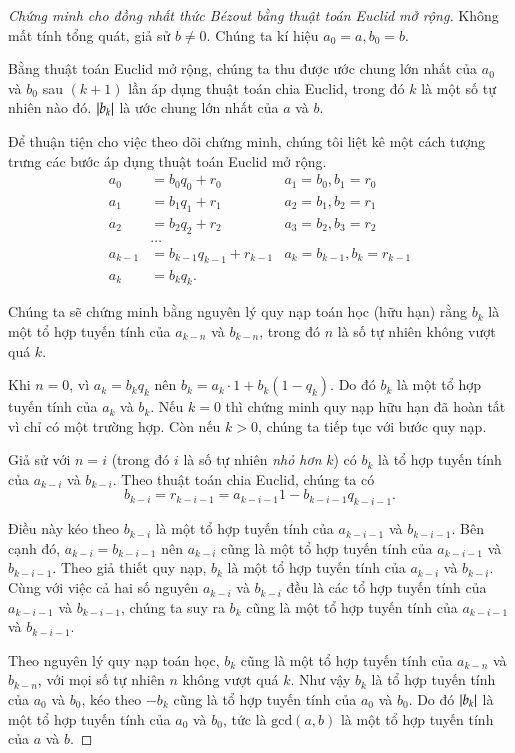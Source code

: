 \begin{proof}[Chứng minh cho đồng nhất thức B\'{e}zout bằng thuật toán Euclid mở rộng]
	Không mất tính tổng quát, giả sử $b\ne 0$. Chúng ta kí hiệu $a_{0} = a, b_{0} = b$.

	Bằng thuật toán Euclid mở rộng, chúng ta thu được ước chung lớn nhất của $a_{0}$ và $b_{0}$ sau $(k+1)$ lần áp dụng thuật toán chia Euclid, trong đó $k$ là một số tự nhiên nào đó. $\left\vert{b_{k}}\right\vert$ là ước chung lớn nhất của $a$ và $b$.

	Để thuận tiện cho việc theo dõi chứng minh, chúng tôi liệt kê một cách tượng trưng các bước áp dụng thuật toán Euclid mở rộng.
	\begin{align*}
		a_{0}   & = b_{0} q_{0} + r_{0}       & a_{1} = b_{0}, b_{1} = r_{0}     \\
		a_{1}   & = b_{1} q_{1} + r_{1}       & a_{2} = b_{1}, b_{2} = r_{1}     \\
		a_{2}   & = b_{2} q_{2} + r_{2}       & a_{3} = b_{2}, b_{3} = r_{2}     \\
		        & \ldots                                                         \\
		a_{k-1} & = b_{k-1} q_{k-1} + r_{k-1} & a_{k} = b_{k-1}, b_{k} = r_{k-1} \\
		a_{k}   & = b_{k} q_{k}.
	\end{align*}

	Chúng ta sẽ chứng minh bằng nguyên lý quy nạp toán học (hữu hạn) rằng $b_{k}$ là một tổ hợp tuyến tính của $a_{k-n}$ và $b_{k-n}$, trong đó $n$ là số tự nhiên không vượt quá $k$.

	Khi $n = 0$, vì $a_{k} = b_{k} q_{k}$ nên $b_{k} = a_{k}\cdot 1 + b_{k} (1 - q_{k})$.  Do đó $b_{k}$ là một tổ hợp tuyến tính của $a_{k}$ và $b_{k}$. Nếu $k = 0$ thì chứng minh quy nạp hữu hạn đã hoàn tất vì chỉ có một trường hợp. Còn nếu $k > 0$, chúng ta tiếp tục với bước quy nạp.

	Giả sử với $n = i$ (trong đó $i$ là số tự nhiên \textit{nhỏ hơn} $k$) có $b_{k}$ là tổ hợp tuyến tính của $a_{k-i}$ và $b_{k-i}$. Theo thuật toán chia Euclid, chúng ta có
	\[
		b_{k-i} = r_{k-i-1} = a_{k-i-1} 1 - b_{k-i-1} q_{k-i-1}.
	\]

	Điều này kéo theo $b_{k-i}$ là một tổ hợp tuyến tính của $a_{k-i-1}$ và $b_{k-i-1}$. Bên cạnh đó, $a_{k-i} = b_{k-i-1}$ nên $a_{k-i}$ cũng là một tổ hợp tuyến tính của $a_{k-i-1}$ và $b_{k-i-1}$. Theo giả thiết quy nạp, $b_{k}$ là một tổ hợp tuyến tính của $a_{k-i}$ và $b_{k-i}$. Cùng với việc cả hai số nguyên $a_{k-i}$ và $b_{k-i}$ đều là các tổ hợp tuyến tính của $a_{k-i-1}$ và $b_{k-i-1}$, chúng ta suy ra $b_{k}$ cũng là một tổ hợp tuyến tính của $a_{k-i-1}$ và $b_{k-i-1}$.

	Theo nguyên lý quy nạp toán học, $b_{k}$ cũng là một tổ hợp tuyến tính của $a_{k-n}$ và $b_{k-n}$, với mọi số tự nhiên $n$ không vượt quá $k$. Như vậy $b_{k}$ là tổ hợp tuyến tính của $a_{0}$ và $b_{0}$, kéo theo $-b_{k}$ cũng là tổ hợp tuyến tính của $a_{0}$ và $b_{0}$. Do đó $\left\vert{b_{k}}\right\vert$ là một tổ hợp tuyến tính của $a_{0}$ và $b_{0}$, tức là $\text{gcd}(a, b)$ là một tổ hợp tuyến tính của $a$ và $b$.
\end{proof}

